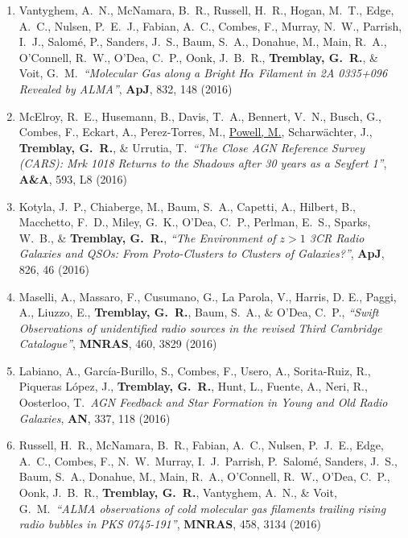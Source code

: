 \documentclass[11pt]{article}
\begin{document}
\begin{enumerate}[resume]
\item Vantyghem, A.~N., McNamara, B.~R.,
Russell, H.~R., Hogan, M.~T., Edge, A.~C.,
Nulsen, P.~E.~J., Fabian, A.~C., Combes, F.,
Murray, N.~W., Parrish, I.~J., Salom\'{e}, P.,
Sanders, J.~S., Baum, S.~A., Donahue, M.,
Main, R.~A., O'Connell, R.~W., O'Dea, C.~P.,
Oonk, J.~B.~R., \textbf{Tremblay, G.~R.}, \& Voit, G.~M.\ \textit{``Molecular Gas along a Bright H$\alpha$ Filament in 2A 0335+096 Revealed by ALMA''}, \textbf{ApJ}, 832, 148 (2016)

\item McElroy, R.~E., Husemann, B.,
Davis, T.~A., Bennert, V.~N., Busch, G.,
Combes, F., Eckart, A., Perez-Torres,
M., \uline{Powell, M.}, Scharw\"{a}chter, J., \textbf{Tremblay, G.~R.}, \& Urrutia, T.\ \textit{``The Close AGN Reference Survey (CARS): Mrk 1018 Returns to the Shadows after 30 years as a Seyfert 1''}, \textbf{A\&A}, 593, L8 (2016)


\item Kotyla, J.~P., Chiaberge, M., Baum, S.~A., Capetti, A., Hilbert, B., Macchetto, F.~D., Miley, G.~K., O'Dea, C.~P., Perlman, E.~S., Sparks, W.~B., \& \textbf{Tremblay, G.~R.}, \textit{``The Environment of $z>1$ 3CR Radio Galaxies and QSOs: From Proto-Clusters to Clusters of Galaxies?''}, \textbf{ApJ}, 826, 46 (2016)


\item Maselli, A., Massaro, F., Cusumano, G., La Parola, V., Harris, D. E., Paggi, A., Liuzzo, E., \textbf{Tremblay, G.~R.},
Baum, S.~A., \& O'Dea, C.~P., \textit{``Swift Observations of unidentified radio sources in the revised Third Cambridge Catalogue''}, \textbf{MNRAS}, 460, 3829 (2016)

\item Labiano, A., Garc\'{i}a-Burillo, S., Combes, F., Usero, A., Sorita-Ruiz, R., Piqueras L\'{o}pez, J., \textbf{Tremblay, G.~R.}, Hunt, L., Fuente, A., Neri, R.,
Oosterloo, T.\ \textit{AGN Feedback and Star Formation in Young and Old Radio Galaxies}, \textbf{AN}, 337, 118 (2016)

\item Russell, H.~R., McNamara, B.~R., Fabian, A.~C., Nulsen, P.~J.~E., Edge, A.~C., Combes, F., N.~W.~Murray, I.~J.~Parrish, P.~Salom\'{e}, Sanders, J.~S., Baum, S.~A., Donahue, M., Main, R.~A.,
O'Connell, R.~W., O'Dea, C.~P., Oonk, J.~B.~R., \textbf{Tremblay, G.~R.}, Vantyghem, A.~N., \& Voit, G.~M.\ \textit{``ALMA observations of cold molecular gas filaments trailing rising radio bubbles in PKS 0745-191''}, \textbf{MNRAS}, 458, 3134 (2016)



\end{enumerate}
\end{document}
